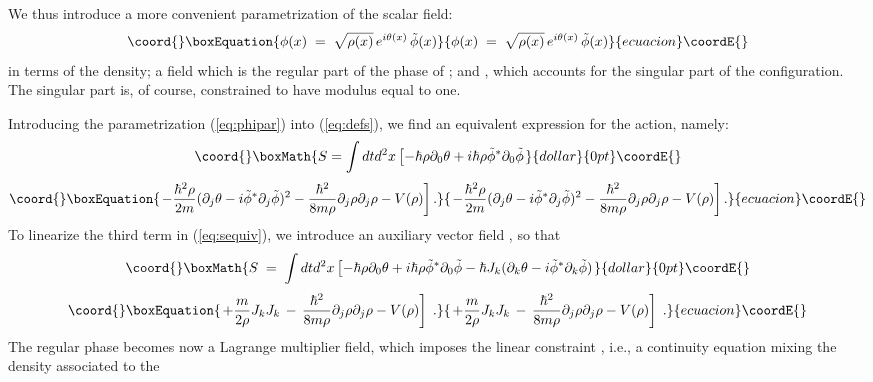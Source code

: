 \documentclass[a4paper,12pt]{article} \tolerance=200
\begin{document}
We thus introduce a more convenient
parametrization of the scalar field:
\begin{equation}\coord{}\boxEquation{\label{eq:phipar}
\phi(x) \;=\; \sqrt{\rho (x)} \, e^{i \theta (x)} \, {\tilde \phi}(x)
}{\phi(x) \;=\; \sqrt{\rho (x)} \, e^{i \theta (x)} \, {\tilde \phi}(x)
}{ecuacion}\coordE{}\end{equation}
in terms of the density; a field \myHighlight{$\theta$}\coordHE{} which is the regular part of
the phase of \myHighlight{$\phi$}\coordHE{}; and \myHighlight{${\tilde \phi}$}\coordHE{}, which accounts for the
singular part of the configuration. The singular part is, of course,
constrained to have modulus equal to one.

Introducing the parametrization (\ref{eq:phipar}) into
(\ref{eq:defs}), we find an equivalent expression for the action,
namely:
$$\coord{}\boxMath{
S=\int dt d^2x \left[- \hbar \rho \partial_0 \theta + i \hbar \rho {\tilde \phi}^* \partial_0 {\tilde \phi} \right.
}{dollar}{0pt}\coordE{}$$
\begin{equation}\coord{}\boxEquation{\label{eq:sequiv}
\left. - \frac{\hbar^2\rho}{2 m} (\partial_j \theta - i {\tilde \phi}^* \partial_j {\tilde \phi})^2 -
\frac{\hbar^2}{8 m \rho} \partial_j \rho \partial_j \rho - V(\rho) \right].
}{\left. - \frac{\hbar^2\rho}{2 m} (\partial_j \theta - i {\tilde \phi}^* \partial_j {\tilde \phi})^2 -
\frac{\hbar^2}{8 m \rho} \partial_j \rho \partial_j \rho - V(\rho) \right].
}{ecuacion}\coordE{}\end{equation}
To linearize the third term in (\ref{eq:sequiv}), we introduce an 
auxiliary
vector field \coordHE{}, so that
$$\coord{}\boxMath{
S\;=\; \int dt d^2x \left[- \hbar \rho \partial_0 \theta + i \hbar
\rho {\tilde \phi}^* \partial_0 {\tilde \phi} - \hbar J_k (\partial_k
\theta - i {\tilde \phi}^* \partial_k {\tilde \phi}) \right.
}{dollar}{0pt}\coordE{}$$
\begin{equation}\coord{}\boxEquation{\label{eq:sequiv1}
\left. + \frac{m}{2 \rho} J_k J_k \,-\,\frac{\hbar^2}{8 m \rho}
\partial_j \rho \partial_j \rho - V(\rho) \right]\;.
}{\left. + \frac{m}{2 \rho} J_k J_k \,-\,\frac{\hbar^2}{8 m \rho}
\partial_j \rho \partial_j \rho - V(\rho) \right]\;.
}{ecuacion}\coordE{}\end{equation}
The regular phase \myHighlight{$\theta$}\coordHE{} becomes now a Lagrange multiplier field,
which imposes the linear constraint \coordHE{}, i.e., a continuity equation mixing the density associated to the
\end{document}
